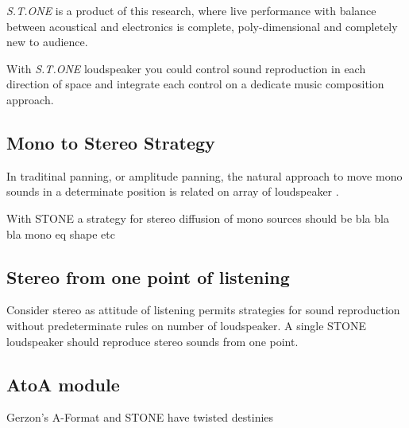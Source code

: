 \documentclass{article}
\begin{document}
\emph{S.T.ONE} is a product of this research, where live performance with balance between
acoustical and electronics is complete, poly-dimensional and completely new to audience.

With \emph{S.T.ONE} loudspeaker you could control sound reproduction in each direction of
space and integrate each control on a dedicate music composition approach.


\subsection{Mono to Stereo Strategy}
\label{sec:m2st}

In traditinal panning, or amplitude panning, the natural approach to move mono sounds in a
determinate position is related on array of loudspeaker .

With STONE a strategy for stereo diffusion of mono sources should be bla bla bla mono eq shape etc


\subsection{Stereo from one point of listening}
\label{sec:stereo}

Consider stereo as attitude of listening permits strategies for sound reproduction without
predeterminate rules on number of loudspeaker. A single STONE loudspeaker should reproduce stereo
sounds from one point.


\subsection{AtoA module}
\label{sec:atoa}

Gerzon's A-Format and STONE have twisted destinies

%
\end{document}
